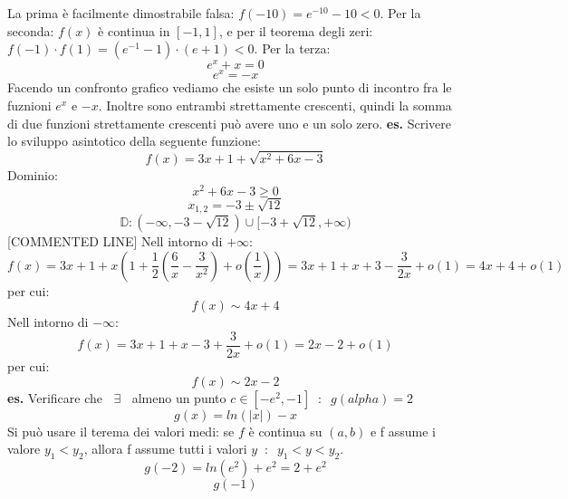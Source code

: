 La prima è facilmente dimostrabile falsa: $f(-10) = e^{-10}-10 <0$.
\newline
Per la seconda: $f(x)$ è continua in $[-1,1]$, e per il teorema degli zeri: $f(-1) \cdot  f(1) = (e^{-1}-1)\cdot (e+1)<0$.
\newline
Per la terza:
\[
    e^x+x = 0
\]
\[
    e^x = -x
\]
Facendo un confronto grafico vediamo che esiste un solo punto di incontro fra le fuznioni $e^x$ e $-x$. Inoltre sono entrambi strettamente crescenti, quindi la somma di due funzioni strettamente crescenti può avere uno e un solo zero.
\newline
\newline
\newline
\textbf{es.} Scrivere lo sviluppo asintotico della seguente funzione:
\[
    f(x)  = 3x +1 + \sqrt{x^2+6x-3}
\]
Dominio:
\[
    x^2 +6x-3 \geq 0
\]
\[
    x_{1,2} = -3 \pm \sqrt{12}
\]
\[
    \mathbb{D}: (-\infty, -3-\sqrt{12}) \cup [-3 + \sqrt{12},+ \infty)
\]
[COMMENTED LINE]
\newline
Nell intorno di $+ \infty$:
\[
    f(x) = 3x +1+  x ( 1 + \frac{1}{2} ( \frac{6}{x} - \frac{3}{x^2}) + o(\frac{1}{x})) = 3x+1+x+3- \frac{3}{2x} +o(1) = 4x +4+o(1)
\]
per cui:
\[
    f(x) \sim 4x+4
\]
Nell intorno di $- \infty$:
\[
    f(x) = 3x+1+x-3+ \frac{3}{2x} + o(1) = 2x-2 + o(1)
\]
per cui:
\[
    f(x) \sim 2x-2
\]
\newline
\newline
\newline
\textbf{es.} Verificare che $\;\;\exists\;\;$ almeno un punto $c \in[-e^2,-1] \;\;:\;\; g(  alpha) = 2$
\[
    g(x) = ln(|x|) -x
\]
Si può usare il terema dei valori medi:
\newline
se $f$ è continua su $(a,b)$ e f assume i valore $y_1 < y_2$, allora f assume tutti i valori $y \;\;:\;\; y_1 < y< y_2$.
\newline
\newline
\[
    g(-2) = ln(e^2) +e^2 = 2+e^2
\]
\[
    g(-1)
\]

